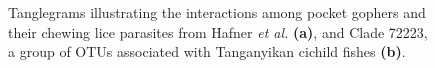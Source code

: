 
\begin{figure}
    \centering
    \caption{Tanglegrams illustrating the interactions among pocket gophers and their chewing lice parasites from Hafner {\em et al.} \cite{hafner1994disparate} \textbf{(a)}, and Clade 72223, a group of OTUs associated with Tanganyikan cichild fishes \textbf{(b)}.}
    \label{fig:FP_tangles}
\end{figure}
